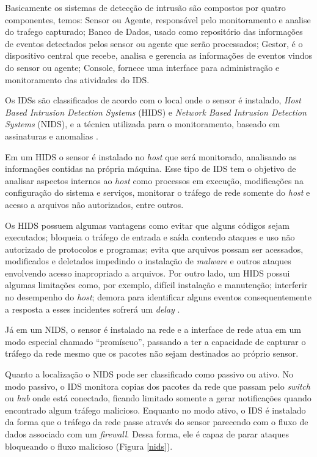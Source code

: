 \documentclass[
	12pt,				
	openright,		
	twoside,	
	a4paper,
	english,	
	brazil	
	]{abntex2}
\begin{document}
Basicamente os sistemas de detecção de intrusão são compostos por quatro componentes, temos: Sensor ou Agente, responsável pelo monitoramento e analise do trafego capturado; Banco de Dados, usado como repositório das informações de eventos detectados pelos sensor ou agente que serão processados; Gestor, é o dispositivo central que recebe, analisa e gerencia as informações de eventos vindos do sensor ou agente; Console, fornece uma interface para administração e monitoramento das atividades do IDS.

Os IDSs são classificados de acordo com o local onde o sensor é instalado, \textit{Host Based Intrusion Detection Systems} (HIDS) e \textit{Network Based Intrusion Detection Systems} (NIDS), e a técnica utilizada para o monitoramento, baseado em assinaturas e anomalias \cite{nagahama2012ipsflow}.

Em um HIDS o sensor é instalado no \textit{host} que será monitorado, analisando as informações contidas na própria máquina. Esse tipo de IDS tem o objetivo de analisar aspectos internos ao \textit{host} como processos em execução, modificações na configuração do sistema e serviços, monitorar o tráfego de rede somente do \textit{host} e acesso a arquivos não autorizados, entre outros.

Os HIDS possuem algumas vantagens como evitar que alguns códigos sejam executados; bloqueia o tráfego de entrada e saída contendo ataques e uso não autorizado de protocolos e programas; evita que arquivos possam ser acessados, modificados e deletados impedindo o instalação de \textit{malware} e outros ataques envolvendo acesso inapropriado a arquivos. Por outro lado, um HIDS possui algumas limitações como, por exemplo, difícil instalação e manutenção; interferir no desempenho do \textit{host}; demora para identificar alguns eventos consequentemente a resposta a esses incidentes sofrerá um \textit{delay} \cite{scarfone01}.

Já em um NIDS, o sensor é instalado na rede e a interface de rede atua em um modo especial chamado ``promíscuo'', passando a ter a capacidade de capturar o tráfego da rede mesmo que os pacotes não sejam destinados ao próprio sensor.

Quanto a localização o NIDS pode ser classificado como passivo ou ativo. No modo passivo, o IDS monitora copias dos pacotes da rede que passam pelo \textit{switch} ou \textit{hub} onde está conectado, ficando limitado somente a gerar notificações quando encontrado algum tráfego malicioso. Enquanto no modo ativo, o IDS é instalado da forma que o tráfego da rede passe através do sensor parecendo com o fluxo de dados associado com um \textit{firewall}. Dessa forma, ele é capaz de parar ataques bloqueando o fluxo malicioso (Figura \ref{nids}). 
\end{document}
